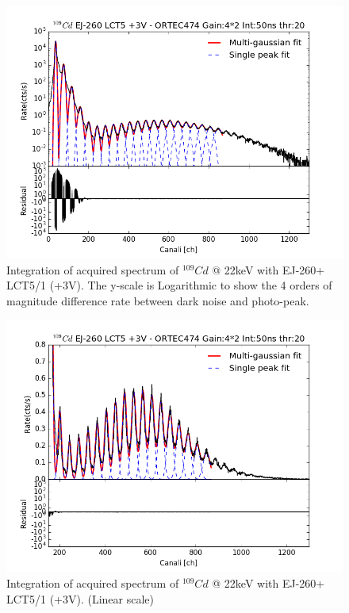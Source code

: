 \documentclass[10pt,a4paper, openany]{book}
\begin{document}
\begin{figure}[!h]
\begin{center}
\includegraphics[scale=0.5]{imm/spec_int.png}
\end{center}
\caption{Integration of acquired spectrum of $^{109}Cd$ @ 22keV with EJ-260+ LCT5/1 (+3V). The y-scale is Logarithmic to show the 4 orders of magnitude difference rate between dark noise and photo-peak. } 
\label{fig:spec_int}
\end{figure}

\begin{figure}[!h]
\begin{center}
\includegraphics[scale=0.5]{imm/spec_int_pk.png}
\end{center}
\caption{Integration of acquired spectrum of $^{109}Cd$ @ 22keV with EJ-260+ LCT5/1 (+3V). (Linear scale) } 
\label{fig:spec_int_pk}
\end{figure}
\end{document}
